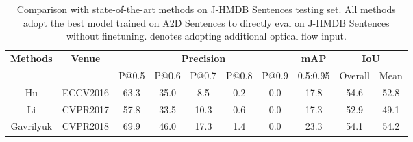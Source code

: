 \documentclass[10pt,twocolumn,letterpaper]{article}
\begin{document}
\begin{table*}[t!]
	\centering
	\scriptsize
	\renewcommand{\arraystretch}{1.0}
	\renewcommand{\tabcolsep}{4.3mm}
	\caption{Comparison with state-of-the-art methods on J-HMDB Sentences testing set. All methods adopt the best model trained on A2D Sentences to directly eval on J-HMDB Sentences without finetuning.  denotes adopting additional optical flow input.}
\vspace{-3mm}
	\begin{tabular}{cccc|cc|ccccc|c|cc|} 
	   \hline
        \multicolumn{4}{|c|}{\multirow{2}{*}{\textbf{Methods}}}  & \multicolumn{2}{|c|}{\multirow{2}{*}{\textbf{Venue}}} & \multicolumn{5}{c|}{\textbf{Precision}}  & \multicolumn{1}{c|}{\textbf{mAP}}  & \multicolumn{2}{c|}{\textbf{IoU}} \\ \cline{7-14}
        \multicolumn{4}{|c|}{}                                   &  \multicolumn{2}{|c|}{}                                 &\multicolumn{1}{c|}{P@0.5}               &\multicolumn{1}{c|}{P@0.6} &\multicolumn{1}{c|}{P@0.7}      &\multicolumn{1}{c|}{P@0.8}  &\multicolumn{1}{|c|}{P@0.9}  &\multicolumn{1}{c|}{0.5:0.95}      &\multicolumn{1}{c|}{Overall}  &\multicolumn{1}{c|}{Mean}   \\  \hline
        
	    \multicolumn{4}{|c|}{Hu \etal \cite{hu2016segmentation}}     & \multicolumn{2}{c|}{ECCV2016}                & \multicolumn{1}{|c|}{63.3} & \multicolumn{1}{c|}{35.0}  & \multicolumn{1}{c|}{8.5} & \multicolumn{1}{c|}{0.2} & \multicolumn{1}{c|}{0.0} &  \multicolumn{1}{c|}{17.8} & \multicolumn{1}{c|}{54.6} & \multicolumn{1}{c|}{52.8} \\
	    
	    
		\multicolumn{4}{|c|}{Li \etal \cite{li2017tracking}}             & \multicolumn{2}{c|}{CVPR2017}    & \multicolumn{1}{c|}{57.8}                & \multicolumn{1}{|c|}{33.5} & \multicolumn{1}{c|}{10.3}  & \multicolumn{1}{c|}{0.6} & \multicolumn{1}{c|}{0.0} & \multicolumn{1}{c|}{17.3} &  \multicolumn{1}{c|}{52.9} & \multicolumn{1}{c|}{49.1}  \\
		
		
		
		\multicolumn{4}{|c|}{Gavrilyuk \etal \cite{gavrilyuk2018actor}}             & \multicolumn{2}{c|}{CVPR2018}     & \multicolumn{1}{c|}{69.9}                & \multicolumn{1}{|c|}{46.0} & \multicolumn{1}{c|}{17.3}  & \multicolumn{1}{c|}{1.4} & \multicolumn{1}{c|}{0.0} & \multicolumn{1}{c|}{23.3} & \multicolumn{1}{c|}{54.1}  & \multicolumn{1}{c|}{54.2}  \\
		

\end{tabular}
\end{table*}
\end{document}
